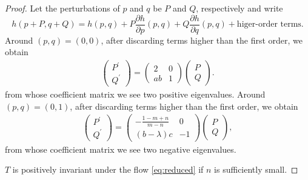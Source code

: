 \documentclass[a4paper,11pt]{article}
\begin{document}
\begin{proof}
Let the perturbations of $p$ and $q$ be $P$ and $Q$, respectively and write
$$h(p+P,q+Q) = h(p,q) + P\frac{\partial h}{\partial p}(p,q) + Q\frac{\partial h}{\partial q}(p,q) + \text{higer-order terms}.$$
Around $(p,q) = (0,0)$, after discarding  terms higher than the first order, we obtain
\begin{align*}
 \begin{pmatrix} {P}^\prime\\ {Q}^\prime \end{pmatrix} =
 \begin{pmatrix} 2 & 0 \\  ab & 1 \end{pmatrix} \begin{pmatrix} {P}\\ {Q} \end{pmatrix}.
\end{align*}
from whose coefficient matrix we see two positive eigenvalues. Around $(p,q) = (0,1)$, after discarding  terms higher than the first order, we obtain
\begin{align*}
 \begin{pmatrix} {P}^\prime\\ {Q}^\prime \end{pmatrix} =
 \begin{pmatrix} -\frac{1-m+n}{m-n} & 0 \\  (b- \lambda)c & -1 \end{pmatrix} \begin{pmatrix} {P}\\ {Q} \end{pmatrix},
\end{align*}
from whose coefficient matrix we see two negative eigenvalues. %

\medskip {}
 $T$ is positively invariant under the flow \eqref{eq:reduced} if $n$ is sufficiently small.
\medskip


\end{proof}
\end{document}
